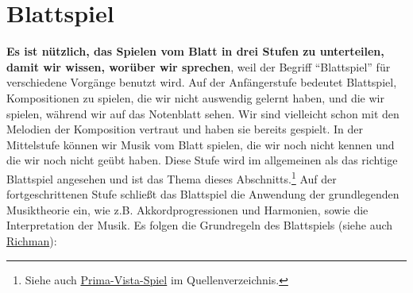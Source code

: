 
\section{Blattspiel}\hypertarget{c1iii11}{}

\textbf{Es ist nützlich, das Spielen vom Blatt in drei Stufen zu unterteilen, damit wir wissen, worüber wir sprechen}, weil der Begriff \enquote{Blattspiel} für verschiedene Vorgänge benutzt wird.
Auf der Anfängerstufe bedeutet Blattspiel, Kompositionen zu spielen, die wir nicht auswendig gelernt haben, und die wir spielen, während wir auf das Notenblatt sehen.
Wir sind vielleicht schon mit den Melodien der Komposition vertraut und haben sie bereits gespielt.
In der Mittelstufe können wir Musik vom Blatt spielen, die wir noch nicht kennen und die wir noch nicht geübt haben.
Diese Stufe wird im allgemeinen als das richtige Blattspiel angesehen und ist das Thema dieses Abschnitts.\footnote{Siehe auch \hyperlink{c030530}{Prima-Vista-Spiel} im Quellenverzeichnis.}
Auf der fortgeschrittenen Stufe schließt das Blattspiel die Anwendung der grundlegenden Musiktheorie ein, wie z.B. Akkordprogressionen und Harmonien, sowie die Interpretation der Musik.
Es folgen die Grundregeln des Blattspiels (siehe auch \hyperlink{Richman}{Richman}):

